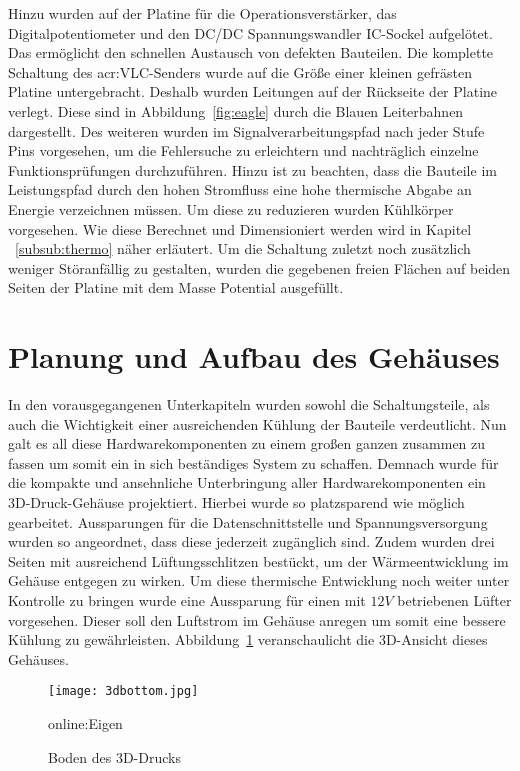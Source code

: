Hinzu wurden auf der Platine für die Operationsverstärker, das Digitalpotentiometer und den DC/DC Spannungswandler IC-Sockel aufgelötet. Das ermöglicht den schnellen Austausch von defekten Bauteilen. Die komplette Schaltung des \gls{acr:VLC}-Senders wurde auf die Größe einer kleinen gefrästen Platine untergebracht. Deshalb wurden Leitungen auf der Rückseite der Platine verlegt. Diese sind in Abbildung~\ref{fig:eagle} durch die Blauen Leiterbahnen dargestellt. Des weiteren wurden im Signalverarbeitungspfad nach jeder Stufe Pins vorgesehen, um die Fehlersuche zu erleichtern und nachträglich einzelne Funktionsprüfungen durchzuführen. Hinzu ist zu beachten, dass die Bauteile im Leistungspfad durch den hohen Stromfluss eine hohe thermische Abgabe an Energie verzeichnen müssen. Um diese zu reduzieren wurden Kühlkörper vorgesehen. Wie diese Berechnet und Dimensioniert werden wird in Kapitel ~\ref{subsub:thermo} näher erläutert. Um die Schaltung zuletzt noch zusätzlich weniger Störanfällig zu gestalten, wurden die gegebenen freien Flächen auf beiden Seiten der Platine mit dem Masse Potential ausgefüllt. 


\section{Planung und Aufbau des Gehäuses}
\label{sec:geh}

In den vorausgegangenen Unterkapiteln wurden sowohl die Schaltungsteile, als auch die Wichtigkeit einer ausreichenden Kühlung der Bauteile verdeutlicht. Nun galt es all diese Hardwarekomponenten zu einem großen ganzen zusammen zu fassen um somit ein in sich beständiges System zu schaffen. Demnach wurde für die kompakte und ansehnliche Unterbringung aller Hardwarekomponenten ein 3D-Druck-Gehäuse projektiert. Hierbei wurde so platzsparend wie möglich gearbeitet. Aussparungen für die Datenschnittstelle und Spannungsversorgung wurden so angeordnet, dass diese jederzeit zugänglich sind. Zudem wurden drei Seiten mit ausreichend Lüftungsschlitzen bestückt, um der Wärmeentwicklung im Gehäuse entgegen zu wirken. Um diese thermische Entwicklung noch weiter unter Kontrolle zu bringen wurde eine Aussparung für einen mit $12V$ betriebenen Lüfter vorgesehen. Dieser soll den Luftstrom im Gehäuse anregen um somit eine bessere Kühlung zu gewährleisten. Abbildung~\ref{fig:3dbottom} veranschaulicht die 3D-Ansicht dieses Gehäuses.

\begin{figure}[H]
	\centering
	\texttt{[image: 3dbottom.jpg]}
	\caption[Boden des 3D-Drucks]{Boden des 3D-Drucks} \gls{online:Eigen}
	\label{fig:3dbottom}
\end{figure}

